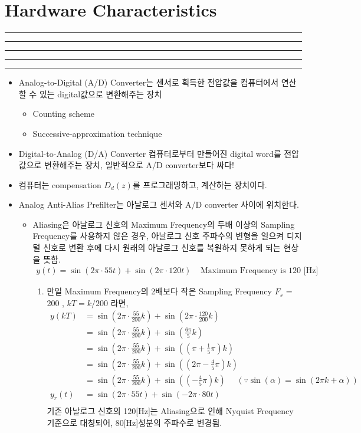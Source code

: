 \setcounter{chapter}{7}
\setcounter{section}{3}
\section{Hardware Characteristics}
\vspace{-8pt} \hrule \hrule \hrule \hrule \hrule  \vspace{12pt}
\begin{itemize}
	\item Analog-to-Digital (A/D) Converter는 센서로 획득한 전압값을 컴퓨터에서 연산할 수 있는 digital값으로 변환해주는 장치
	\begin{itemize}
		\item Counting scheme 
		\item Successive-approximation technique 

	\end{itemize}
	\item Digital-to-Analog (D/A) Converter 컴퓨터로부터 만들어진 digital word를 전압값으로 변환해주는 장치, 일반적으로 A/D converter보다 싸다!
	\item 컴퓨터는 compensation $D_d(z)$를 프로그래밍하고, 계산하는 장치이다.
%
\newpage
%
	\item Analog Anti-Alias Prefilter는 아날로그 센서와 A/D converter 사이에 위치한다. 
	\begin{itemize}
		\item Aliasing은 아날로그 신호의 Maximum Frequency의 두배 이상의 Sampling Frequency를 사용하지 않은 경우, 아날로그 신호 주파수의 변형을 일으켜 디지털 신호로 변환 후에 다시 원래의 아날로그 신호를 복원하지 못하게 되는 현상을 뜻함.
		\begin{align*}
				y(t) = \sin(2 \pi \cdot 55t) +\sin(2\pi \cdot 120t) ~~~~~ \text{Maximum Frequency is 120 [Hz]}
		\end{align*}
		\begin{enumerate}
			\item 만일 Maximum Frequency의 2배보다 작은 Sampling Frequency $F_s$ = 200 \text{[Hz]}, $kT = k/200$ 라면,
				\begin{align*}
					y(kT) &=   \sin(2 \pi \cdot \frac{55}{200}  k) +\sin(2\pi \cdot \frac{120}{200}  k)\\
					      &=   \sin(2 \pi \cdot \frac{55}{200}  k) +\sin(\frac{6\pi}{5}  k)\\
					      &=   \sin(2 \pi \cdot \frac{55}{200}  k) +\sin((\pi + \frac{1}{5}\pi) k)\\
					      &=   \sin(2 \pi \cdot \frac{55}{200}  k) +\sin((2\pi - \frac{4}{5}\pi) k)\\
					      &=   \sin(2 \pi \cdot \frac{55}{200}  k) +\sin((- \frac{4}{5}\pi) k) ~~~~~~(\because \sin(\alpha) = \sin(2\pi k+ \alpha) )\\
					y_r(t)&=    \sin(2 \pi \cdot 55t) +\sin(-2\pi \cdot 80t)\\
				\end{align*}
				기존 아날로그 신호의 120[Hz]는 Aliasing으로 인해 Nyquist Frequency 기준으로 대칭되어, 80[Hz]성분의 주파수로 변경됨. 
				\newpage		
		\end{enumerate}


\end{itemize}
\end{itemize}
